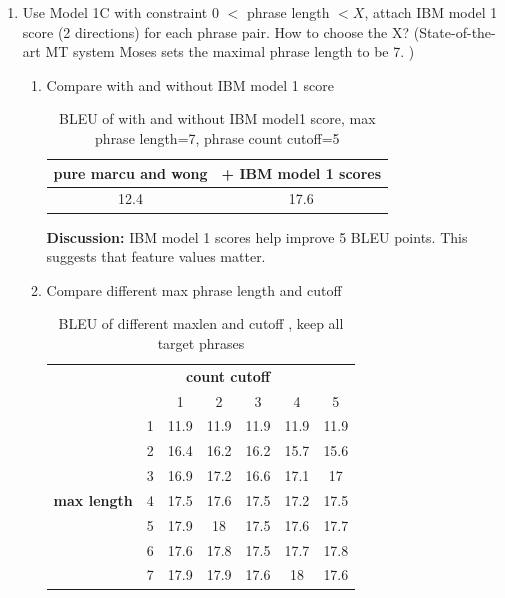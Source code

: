 \documentclass[11pt, letterpaper]{article}   	%
\begin{document}
\begin{enumerate}
\item \label{app1c} Use Model 1C with constraint 0 $<$ phrase length $< X$, attach IBM model 1 score (2 directions) for each phrase pair. How to choose the X? (State-of-the-art MT system Moses\cite{moses-07} sets the maximal phrase length to be 7. )

\begin{enumerate}

\item Compare with and without IBM model 1 score
\begin{table}[H]
\centering
\begin{tabular}{| c | c| }
\hline
\bf{pure marcu and wong} & \bf{+ IBM model 1 scores}\\
\hline
12.4 & 17.6\\
\hline
\end{tabular}
\label{tab:BLEUibmfeature}
\caption{BLEU of with and without IBM model1 score, max phrase length=7, phrase count cutoff=5 }
\end{table}

\textbf{Discussion:} IBM model 1 scores help improve 5 BLEU points. This suggests that feature values matter.

\item Compare different max phrase length and cutoff%

\begin{table}[H]
\centering
\begin{tabular}{ c c | c | c | c | c|c }
& \multicolumn{5}{c}{\bf{ count cutoff}}  \\
&  & 1 &	2 &	3 &	4 &	5\\
\hline
\multirow{7}{*}{\bf{max length}}
& 1 &	11.9 &	11.9 &	11.9 &	11.9 &	11.9\\
\cline{2-7}
& 2 &	16.4 &	16.2 &	16.2 &	15.7 &	15.6\\
\cline{2-7}
& 3 &	16.9 &	17.2 &	16.6 &	17.1 &	17\\
\cline{2-7}
& 4 &	17.5 &	17.6 &	17.5 &	17.2 &	17.5\\
\cline{2-7}
& 5 &	17.9 &	18 &	17.5 &	17.6 &	17.7\\
\cline{2-7}
& 6 &	17.6 &	17.8 &	17.5 &	17.7 &	17.8\\
\cline{2-7}
& 7 &	17.9 &	17.9 &	17.6 &	18 &	17.6\\
\hline
\end{tabular}
\label{tab:fraclex}
\caption{BLEU of different maxlen and cutoff , keep all target phrases}
\end{table}


\end{enumerate}
\end{enumerate}
\end{document}
